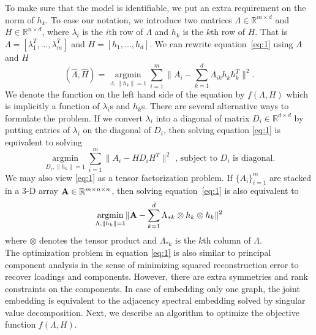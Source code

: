 \documentclass[10pt,journal,compsoc]{IEEEtran}
\begin{document}
\noindent  To make sure that the model is identifiable, we put an extra requirement on the norm of $h_k$. To ease our notation, we introduce two matrices $\Lambda \in \mathbb{R}^{m \times d}$ and $H\in \mathbb{R}^{n \times d}$, where $\lambda_i$ is the $i$th row of $\Lambda$ and $h_k$ is the $k$th row of $H$. That is $\Lambda=[\lambda_1^T,...,\lambda_m^T]$ and $H=[h_1,...,h_d]$. We can rewrite equation~\eqref{eq:1} using $\Lambda$ and $H$
\begin{equation*}
(\hat{\Lambda},\hat{H}) = \underset{\Lambda,\|h_k\|=1}{\operatorname{argmin}} \sum\limits_{i=1}^{m} \| A_i- \sum\limits_{k=1}^{d} \Lambda_{ik} h_k h_k^T \|  ^2.  
\end{equation*}
 We denote the function on the left hand side of the equation by $f(\Lambda,H)$ which is implicitly a function of $\lambda_i$s and $h_k$s. There are several alternative ways to formulate the problem. If we convert $\lambda_i$ into a diagonal of matrix $D_i \in \mathbb{R}^{d \times d}$ by putting entries of $\lambda_i$ on the diagonal of $D_i$, then solving equation \eqref{eq:1} is equivalent to solving
\[  \underset{D_i,\|h_k\|=1}{\operatorname{argmin}} \sum\limits_{i=1}^{m} \| A_i- H D_i H^T \|  ^2  \text{ , subject to $D_i$ is diagonal.}\]
We may also view \eqref{eq:1} as a tensor factorization problem. If $\{A_i\}_{i=1}^m$ are stacked in a 3-D array ${\bf A} \in \mathbb{R}^{m\times n \times n}$, then solving equation~\eqref{eq:1} is also equivalent to
\[  \underset{\Lambda,\|h_k\|=1}{\operatorname{argmin}}  \| {\bf A} - \sum\limits_{k=1}^{d} \Lambda_{*k} \otimes h_k \otimes h_k\|  ^2  \]
where $\otimes$ denotes the tensor product and $\Lambda_{*k}$ is the $k$th column of $\Lambda$. \\

\noindent The optimization problem in equation \eqref{eq:1} is also similar to principal component analysis in the sense of minimizing squared reconstruction error to recover loadings and components. However, there are extra symmetries and rank constraints on the components. In case of embedding only one graph, the joint embedding is equivalent to the adjacency spectral embedding solved by singular value decomposition\cite{sussman2012consistent}. Next, we describe an algorithm to optimize the objective function $f(\Lambda,H)$.  
\end{document}
